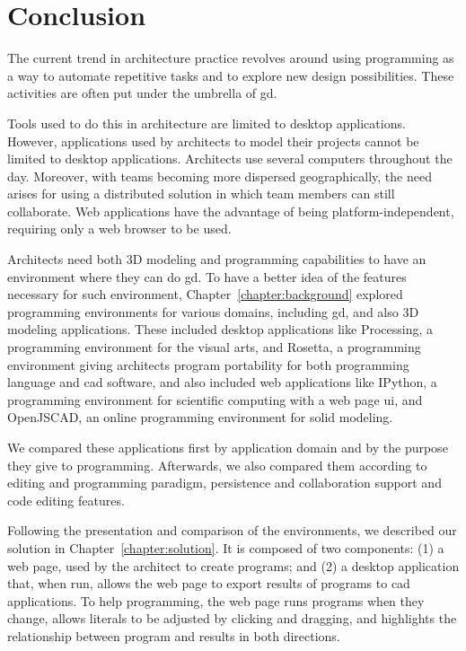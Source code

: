 
\chapter{Conclusion}
\label{chapter:conclusion}
The current trend in architecture practice revolves around using programming as a way to automate repetitive tasks and to explore new design possibilities.
These activities are often put under the umbrella of \acrfull{gd}.

Tools used to do this in architecture are limited to desktop applications.
However, applications used by architects to model their projects cannot be limited to desktop applications.
Architects use several computers throughout the day.
Moreover, with teams becoming more dispersed geographically, the need arises for using a distributed solution in which team members can still collaborate.
Web applications have the advantage of being platform-independent, requiring only a web browser to be used.

Architects need both 3D modeling and programming capabilities to have an environment where they can do \gls{gd}.
To have a better idea of the features necessary for such environment, Chapter~\ref{chapter:background} explored programming environments for various domains, including \gls{gd}, and also 3D modeling applications.
These included desktop applications like Processing, a programming environment for the visual arts, and Rosetta, a programming environment giving architects program portability for both programming language and \gls{cad} software, and also included web applications like IPython, a programming environment for scientific computing with a web page \gls{ui}, and OpenJSCAD, an online programming environment for solid modeling.

We compared these applications first by application domain and by the purpose they give to programming.
Afterwards, we also compared them according to editing and programming paradigm, persistence and collaboration support and code editing features.

Following the presentation and comparison of the environments, we described our solution in Chapter~\ref{chapter:solution}.
It is composed of two components:
(1) a web page, used by the architect to create programs;
and (2) a desktop application that, when run, allows the web page to export results of programs to \gls{cad} applications.
To help programming, the web page runs programs when they change, allows literals to be adjusted by clicking and dragging, and highlights the relationship between program and results in both directions.


